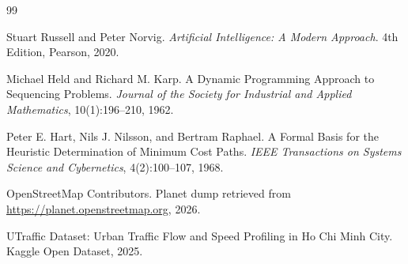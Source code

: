 \begin{thebibliography}{99}

Stuart Russell and Peter Norvig.
\newblock \textit{Artificial Intelligence: A Modern Approach}.
\newblock 4th Edition, Pearson, 2020.

Michael Held and Richard M. Karp.
\newblock A Dynamic Programming Approach to Sequencing Problems.
\newblock \textit{Journal of the Society for Industrial and Applied Mathematics}, 10(1):196--210, 1962.

Peter E. Hart, Nils J. Nilsson, and Bertram Raphael.
\newblock A Formal Basis for the Heuristic Determination of Minimum Cost Paths.
\newblock \textit{IEEE Transactions on Systems Science and Cybernetics}, 4(2):100--107, 1968.

OpenStreetMap Contributors.
\newblock Planet dump retrieved from \url{https://planet.openstreetmap.org}, 2026.

UTraffic Dataset: Urban Traffic Flow and Speed Profiling in Ho Chi Minh City.
\newblock Kaggle Open Dataset, 2025.

\end{thebibliography}
